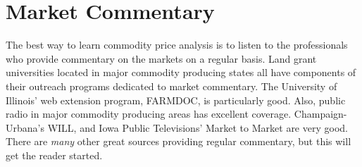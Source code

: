 \documentclass[]{book}
\theoremstyle{definition}
\theoremstyle{definition}
\theoremstyle{remark}
\begin{document}
\section{Market Commentary}\label{market-commentary}

The best way to learn commodity price analysis is to listen to the
professionals who provide commentary on the markets on a regular basis.
Land grant universities located in major commodity producing states all
have components of their outreach programs dedicated to market
commentary. The University of Illinois' web extension program, FARMDOC,
is particularly good. Also, public radio in major commodity producing
areas has excellent coverage. Champaign-Urbana's WILL, and Iowa Public
Televisions' Market to Market are very good. There are \emph{many} other
great sources providing regular commentary, but this will get the reader
started.
\end{document}
